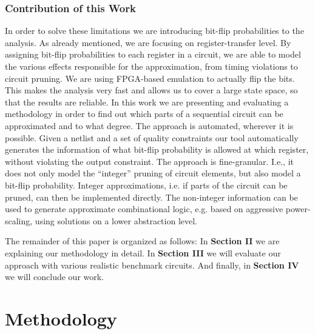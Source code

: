 \documentclass[10pt,twocolumn]{IEEEtran} %
\begin{document}
\subsubsection*{\bf{Contribution of this Work}}
In order to solve these limitations we are introducing bit-flip probabilities to the analysis. As already mentioned, we are focusing on register-transfer level. By assigning bit-flip probabilities to each register in a circuit, we are able to model the various effects responsible for the approximation, from timing violations to circuit pruning. We are using FPGA-based emulation to actually flip the bits. This makes the analysis very fast and allows us to cover a large state space, so that the results are reliable. In this work we are presenting and evaluating a methodology in order to find out which parts of a sequential circuit can be approximated and to what degree. The approach is automated, wherever it is possible. Given a netlist and a set of quality constraints our tool automatically generates the information of what bit-flip probability is allowed at which register, without violating the output constraint. The approach is fine-granular. I.e., it does not only model the ``integer'' pruning of circuit elements, but also model a bit-flip probability. Integer approximations, i.e. if parts of the circuit can be pruned, can then be implemented directly. The non-integer information can be used to generate approximate combinational logic, e.g. based on aggressive power-scaling, using solutions on a lower abstraction level.

The remainder of this paper is organized as follows: In {\bf Section II} we are explaining our methodology in detail. In {\bf Section III} we will evaluate our approach with various realistic benchmark circuits. And finally, in {\bf Section IV} we will conclude our work.



\section{\bf{Methodology}}
\label{sec:methodology}
\end{document}
